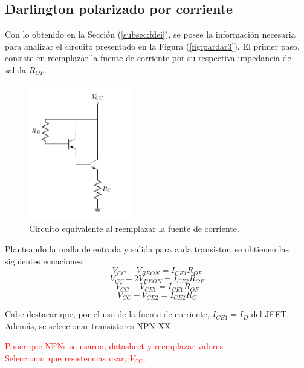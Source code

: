\subsection{Darlington polarizado por corriente}
Con lo obtenido en la Sección (\ref{subsec:fdei}), se posee la información necesaria para analizar el circuito presentado en la Figura (\ref{fig:pardar3}). El primer paso, consiste en reemplazar la fuente de corriente por su respectiva impedancia de salida $R_{OF}$.
\begin{figure}[H]
\centering
	\includegraphics[width=0.4\textwidth, page=5]{Imagenes/ParDarlington.pdf}
	\caption{Circuito equivalente al reemplazar la fuente de corriente.}
	\label{fig:pardar4}
\end{figure}

Planteando la malla de entrada y salida para cada transistor, se obtienen las siguientes ecuaciones:
\begin{equation*}
	V_{CC} - V_{BEON} = I_{CE1} R_{OF}
\end{equation*}
\begin{equation*}
	V_{CC} - 2V_{BEON} = I_{CE2} R_{OF}
\end{equation*}
\begin{equation*}
	V_{CC} - V_{CE1} = I_{CE1} R_{OF}
\end{equation*}
\begin{equation*}
	V_{CC} - V_{CE2} = I_{CE2} R_{C}
\end{equation*}

Cabe destacar que, por el uso de la fuente de corriente, $I_{CE1} = I_{D}$ del JFET. Además, se seleccionar transistores NPN XX
\begin{center}
	\LARGE{\textcolor{red}{Poner que NPNs se usaron, datasheet y reemplazar valores.}} \\
	\LARGE{\textcolor{red}{Seleccionar que resistencias usar, $V_{CC}$.}}
\end{center}

